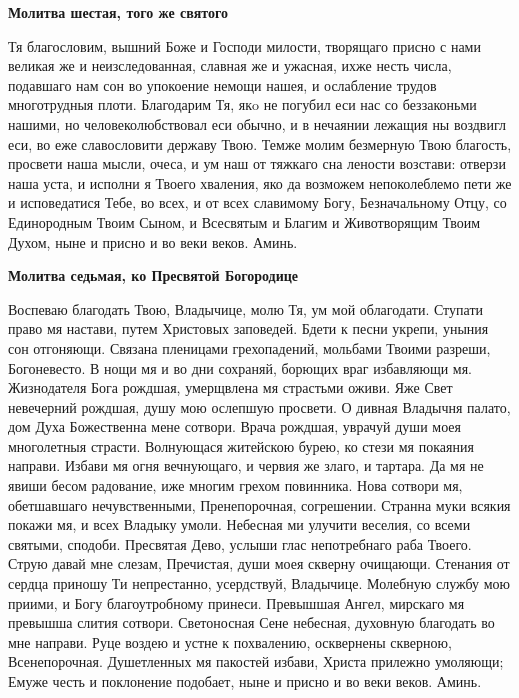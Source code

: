 \medskip
\bfseries Молитва шестая, того же святого\normalfont{}\nopagebreak


Тя благословим, вышний Боже и Господи милости, творящаго присно с нами великая же и неизследованная, славная же и ужасная, ихже несть числа, подавшаго нам сон во упокоение немощи нашея, и ослабление трудов многотрудныя плоти. Благодарим Тя, якo не погубил еси нас со беззаконьми нашими, но человеколюбствовал еси обычно, и в нечаянии лежащия ны воздвигл еси, во еже славословити державу Твою. Темже молим безмерную Твою благость, просвети наша мысли, очеса, и ум наш от тяжкаго сна лености возстави: отверзи наша уста, и исполни я Твоего хваления, яко да возможем непоколеблемо пети же и исповедатися Тебе, во всех, и от всех славимому Богу, Безначальному Отцу, со Единородным Твоим Сыном, и Всесвятым и Благим и Животворящим Твоим Духом, ныне и присно и во веки веков. Аминь. 


\medskip
\bfseries Молитва седьмая, ко Пресвятой Богородице\normalfont{}\nopagebreak


Воспеваю благодать Твою, Владычице, молю Тя, ум мой облагодати. Ступати право мя настави, путем Христовых заповедей. Бдети к песни укрепи, уныния сон отгоняющи. Связана пленицами грехопадений, мольбами Твоими разреши, Богоневесто. В нощи мя и во дни сохраняй, борющих враг избавляющи мя. Жизнодателя Бога рождшая, умерщвлена мя страстьми оживи. Яже Свет невечерний рождшая, душу мою ослепшую просвети. О дивная Владычня палато, дом Духа Божественна мене сотвори. Врача рождшая, уврачуй души моея многолетныя страсти. Волнующася житейскою бурею, ко стези мя покаяния направи. Избави мя огня вечнующаго, и червия же злаго, и тартара. Да мя не явиши бесом радование, иже многим грехом повинника. Нова сотвори мя, обетшавшаго нечувственными, Пренепорочная, согрешении. Странна муки всякия покажи мя, и всех Владыку умоли. Небесная ми улучити веселия, со всеми святыми, сподоби. Пресвятая Дево, услыши глас непотребнаго раба Твоего. Струю давай мне слезам, Пречистая, души моея скверну очищающи. Стенания от сердца приношу Ти непрестанно, усердствуй, Владычице. Молебную службу мою приими, и Богу благоутробному принеси. Превышшая Ангел, мирскаго мя превышша слития сотвори. Светоносная Сене небесная, духовную благодать во мне направи. Руце воздею и устне к похвалению, осквернены скверною, Всенепорочная. Душетленных мя пакостей избави, Христа прилежно умоляющи; Емуже честь и поклонение подобает, ныне и присно и во веки веков. Аминь. 


